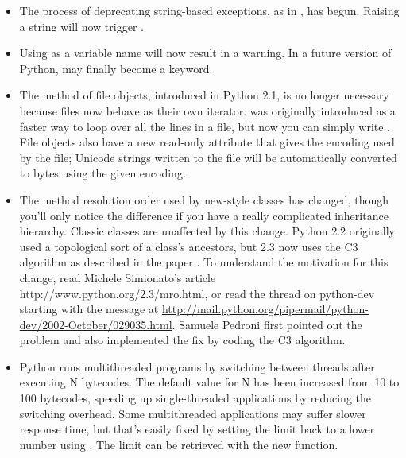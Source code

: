 \documentclass{howto}
\begin{document}
\begin{itemize}
\item The process of deprecating string-based exceptions, as
in , has begun.  Raising a string will
now trigger .

\item Using  as a variable name will now result in a
 warning.  In a future version of Python,
 may finally become a keyword.

\item The  method of file objects, introduced in
Python 2.1, is no longer necessary because files now behave as their
own iterator.   was originally introduced as a
faster way to loop over all the lines in a file, but now you can
simply write .  File objects also have a
new read-only  attribute that gives the encoding used
by the file; Unicode strings written to the file will be automatically 
converted to bytes using the given encoding.

\item The method resolution order used by new-style classes has
changed, though you'll only notice the difference if you have a really
complicated inheritance hierarchy.  Classic classes are unaffected by
this change.  Python 2.2 originally used a topological sort of a
class's ancestors, but 2.3 now uses the C3 algorithm as described in
the paper .
To understand the motivation for this change, 
read Michele Simionato's article 
      {http://www.python.org/2.3/mro.html}, or
read the thread on python-dev starting with the message at
\url{http://mail.python.org/pipermail/python-dev/2002-October/029035.html}.
Samuele Pedroni first pointed out the problem and also implemented the
fix by coding the C3 algorithm.

\item Python runs multithreaded programs by switching between threads
after executing N bytecodes.  The default value for N has been
increased from 10 to 100 bytecodes, speeding up single-threaded
applications by reducing the switching overhead.  Some multithreaded
applications may suffer slower response time, but that's easily fixed
by setting the limit back to a lower number using
.
The limit can be retrieved with the new 
 function.


\end{itemize}
\end{document}
